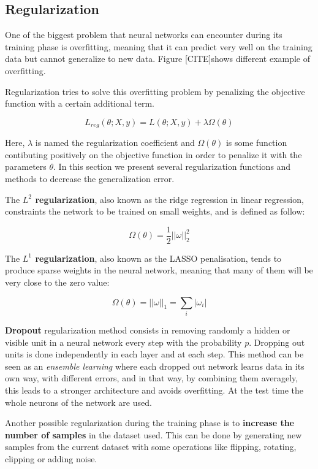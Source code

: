 \documentclass[master,final,11pt]{iscs-thesis}
\begin{document}
\subsection{Regularization}

One of the biggest problem that neural networks can encounter during its training phase is overfitting, meaning that it can predict very well on the training data but cannot generalize to new data. Figure [CITE]shows different example of overfitting.

Regularization tries to solve this overfitting problem by penalizing the objective function with a certain additional term.

\[
L_{reg}(\theta; X, y) = L(\theta; X, y) + \lambda \Omega(\theta)
\]

Here, $\lambda$ is named the regularization coefficient and $\Omega(\theta)$ is some function contibuting positively on the objective function in order to penalize it with the parameters $\theta$. In this section we present several regularization functions and methods to decrease the generalization error.

The \textbf{$L^2$ regularization}, also known as the ridge regression in linear regression, constraints the network to be trained on small weights, and is defined as follow:

\[
\Omega(\theta)= \frac{1}{2}|| \omega ||^2_2
\]

The \textbf{$L^1$ regularization}, also known as the LASSO penalisation, tends to produce sparse weights in the neural network, meaning that many of them will be very close to the zero value:

\[
\Omega(\theta)= || \omega ||_1=\sum_i|\omega_i|
\]

\textbf{Dropout} \cite{DO} regularization method consists in removing randomly a hidden or visible unit in a neural network every step with the probability $p$. Dropping out units is done independently in each layer and at each step. This method can be seen as an \textit{ensemble learning} where each dropped out network learns data in its own way, with different errors, and in that way, by combining them averagely, this leads to a stronger architecture and avoids overfitting. At the test time the whole neurons of the network are used.

Another possible regularization during the training phase is to \textbf{increase the number of samples} in the dataset used. This can be done by generating new samples from the current dataset with some operations like flipping, rotating, clipping or adding noise.
\end{document}
